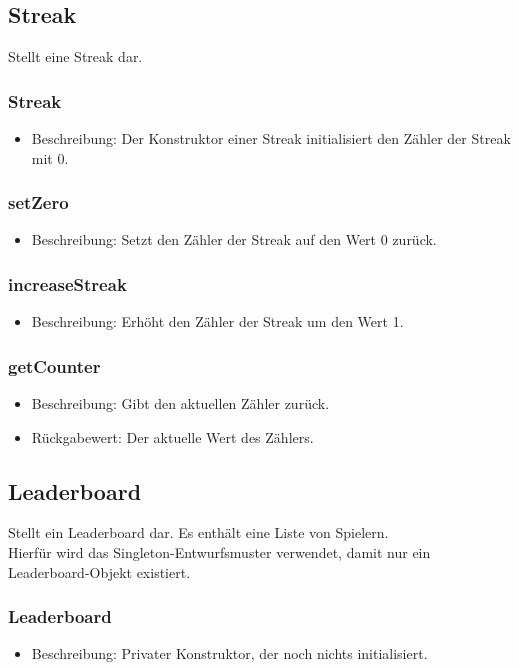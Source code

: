 \documentclass[a4paper]{scrreprt}
\begin{document}
	\subsection{Streak}
	Stellt eine Streak dar.

	\subsubsection{Streak}
	\begin{itemize}
		\item Beschreibung: Der Konstruktor einer Streak initialisiert den Zähler der Streak mit 0.
	\end{itemize}
	\subsubsection{setZero}
	\begin{itemize}
		\item Beschreibung: Setzt den Zähler der Streak auf den Wert 0 zurück.
	\end{itemize}
	\subsubsection{increaseStreak}
	\begin{itemize}
		\item Beschreibung: Erhöht den Zähler der Streak um den Wert 1.
	\end{itemize}
	\subsubsection{getCounter}
	\begin{itemize}
		\item Beschreibung: Gibt den aktuellen Zähler zurück.
		\item Rückgabewert: Der aktuelle Wert des Zählers.
	\end{itemize}


	\subsection{Leaderboard}
	Stellt ein Leaderboard dar. Es enthält eine Liste von Spielern. \\
	Hierfür wird das Singleton-Entwurfsmuster verwendet, damit nur ein Leaderboard-Objekt existiert.

	\subsubsection{Leaderboard}
	\begin{itemize}
		\item Beschreibung: Privater Konstruktor, der noch nichts initialisiert.
	\end{itemize}
\end{document}
